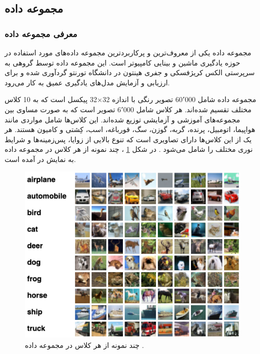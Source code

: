 \subsection{
	مجموعه داده
}

\vspace{3mm}
\subsubsection{
	معرفی مجموعه داده
}\vspace{-1mm}

مجموعه داده
یکی از معروف‌ترین و پرکاربردترین مجموعه داده‌های مورد استفاده در حوزه یادگیری ماشین و بینایی کامپیوتر است. این مجموعه داده توسط گروهی به سرپرستی الکس کریژفسکی%
و جفری هینتون%
در دانشگاه تورنتو گردآوری شده و برای ارزیابی و آزمایش مدل‌های یادگیری عمیق به کار می‌رود.


مجموعه داده
شامل 60٬000 تصویر رنگی با اندازه
32$\times$32
پیکسل است که به 10 کلاس مختلف تقسیم شده‌اند. هر کلاس شامل 6٬000 تصویر است که به صورت مساوی بین مجموعه‌های آموزشی و آزمایشی توزیع شده‌اند. این کلاس‌ها شامل مواردی مانند هواپیما، اتومبیل، پرنده، گربه، گوزن، سگ، قورباغه، اسب، کِشتی و کامیون هستند. هر یک از این کلاس‌ها دارای تصاویری است که تنوع بالایی از زوایا، پس‌زمینه‌ها و شرایط نوری مختلف را شامل می‌شود
\cite{krizhevsky2009learning}.
در شکل
\ref{cifar10}%
، چند نمونه از هر کلاس در مجموعه داده
\mbox{}
به نمایش در آمده است.


\begin{figure}[t]
	\centering
	\includegraphics[scale=0.7]{images/chap5/cifar10.png}%
	\caption{%
		چند نمونه از هر کلاس در مجموعه داده
		\cite{Evan2022CIFAR10}.
	}
	\label{cifar10}
	\centering
\end{figure}



